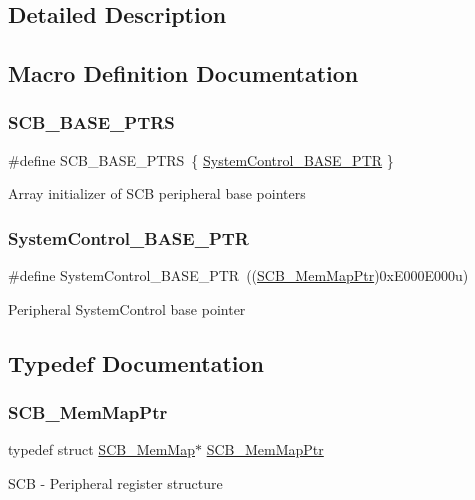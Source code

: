 \subsection{Detailed Description}


\subsection{Macro Definition Documentation}
\mbox{\label{group___s_c_b___peripheral_gaf74b4dbfa6fd0a5607314e170a0c1d48}} 
\subsubsection{\texorpdfstring{S\+C\+B\+\_\+\+B\+A\+S\+E\+\_\+\+P\+T\+RS}{SCB\_BASE\_PTRS}}
{\footnotesize\ttfamily \#define S\+C\+B\+\_\+\+B\+A\+S\+E\+\_\+\+P\+T\+RS~\{ \hyperlink{group___s_c_b___peripheral_gaf22864785770f832103e904244e078cb}{System\+Control\+\_\+\+B\+A\+S\+E\+\_\+\+P\+TR} \}}

Array initializer of S\+CB peripheral base pointers \mbox{\label{group___s_c_b___peripheral_gaf22864785770f832103e904244e078cb}} 
\subsubsection{\texorpdfstring{System\+Control\+\_\+\+B\+A\+S\+E\+\_\+\+P\+TR}{SystemControl\_BASE\_PTR}}
{\footnotesize\ttfamily \#define System\+Control\+\_\+\+B\+A\+S\+E\+\_\+\+P\+TR~((\hyperlink{group___s_c_b___peripheral_ga08aca299c99cac47121d9e64e7b8e1cf}{S\+C\+B\+\_\+\+Mem\+Map\+Ptr})0x\+E000\+E000u)}

Peripheral System\+Control base pointer 

\subsection{Typedef Documentation}
\mbox{\label{group___s_c_b___peripheral_ga08aca299c99cac47121d9e64e7b8e1cf}} 
\subsubsection{\texorpdfstring{S\+C\+B\+\_\+\+Mem\+Map\+Ptr}{SCB\_MemMapPtr}}
{\footnotesize\ttfamily typedef struct \hyperlink{struct_s_c_b___mem_map}{S\+C\+B\+\_\+\+Mem\+Map}$\ast$ \hyperlink{group___s_c_b___peripheral_ga08aca299c99cac47121d9e64e7b8e1cf}{S\+C\+B\+\_\+\+Mem\+Map\+Ptr}}

S\+CB -\/ Peripheral register structure 